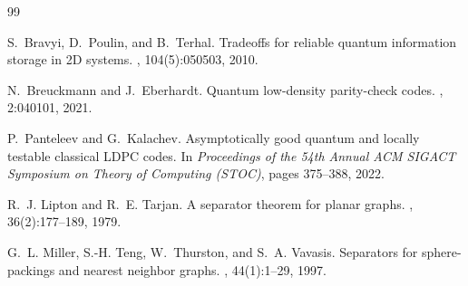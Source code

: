 \documentclass[11pt,a4paper]{article}
\theoremstyle{definition}
\theoremstyle{remark}
\begin{document}
\begin{thebibliography}{99}

S.~Bravyi, D.~Poulin, and B.~Terhal.
\newblock Tradeoffs for reliable quantum information storage in 2D systems.
, 104(5):050503, 2010.

N.~Breuckmann and J.~Eberhardt.
\newblock Quantum low-density parity-check codes.
, 2:040101, 2021.

P.~Panteleev and G.~Kalachev.
\newblock Asymptotically good quantum and locally testable classical LDPC codes.
\newblock In {\em Proceedings of the 54th Annual ACM SIGACT Symposium on Theory of Computing (STOC)}, pages 375--388, 2022.

R.~J. Lipton and R.~E. Tarjan.
\newblock A separator theorem for planar graphs.
, 36(2):177--189, 1979.

G.~L. Miller, S.-H. Teng, W.~Thurston, and S.~A. Vavasis.
\newblock Separators for sphere-packings and nearest neighbor graphs.
, 44(1):1--29, 1997.

\end{thebibliography}
\end{document}
